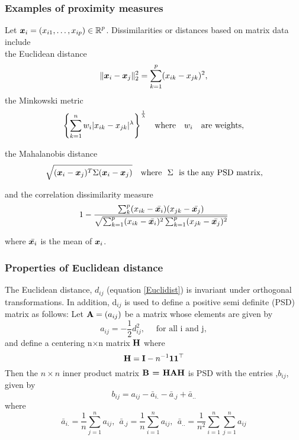 \subsubsection{Examples of proximity measures}
Let $\boldsymbol{x}_{i} = (x_{i1}, \ldots, x_{ip} ) \in \operatorname{\mathbb{R}}^{p}$. Dissimilarities or distances based on matrix data include\\
 the Euclidean distance
\begin{equation}\label{Euclidist}
\displaystyle{ \lVert\boldsymbol{x}_{i} - \boldsymbol{x}_{j}\rVert^{2}_{2} = \sum_{k=1}^{p} (x_{ik} - x_{jk})^{2}  },
\end{equation}
the Minkowski metric 
\begin{equation}\label{Minkowski}
\displaystyle{ \left \{\sum_{k=1}^{n} w_{i} \lvert x_{ik} - x_{jk} \rvert^{\lambda} 
\right \}^{\frac{1}{\lambda}} } \quad \text{where} \quad w_{i} \quad \text{are weights},
\end{equation}

the Mahalanobis distance 
\begin{equation}\label{Mahalanobis}
\displaystyle{ \sqrt{ (\vect{x}_{i} - \vect{x}_{j})^{T} \Sigma (\vect{x}_{i} - \vect{x}_{j})} } \quad \text{where} \ \  \Sigma \ \ \text{is the any PSD matrix},
\end{equation}

and the correlation dissimilarity measure
\begin{equation}\label{correlationdist}
\displaystyle{  1 - \dfrac{ \sum_{k}^{p} (x_{ik} - \bar{\boldsymbol{x}_{i}})
 (x_{jk} - \bar{\boldsymbol{x}_{j}} )} 
 { \sqrt{ \sum_{k=1}^{p}  (x_{ik} - \bar{\boldsymbol{x}_{i}})^{2} 
 \sum_{k=1}^{p} (x_{jk} -   \bar{\boldsymbol{x}_{j}})^{2}    } } } 
\end{equation}

where  $\bar{\boldsymbol{x}_{i}}$ is the mean of $\boldsymbol{x}_{i}$.

\subsubsection{Properties of Euclidean distance}
The Euclidean distance, $d_{ij}$ (equation \eqref{Euclidist}) is invariant under orthogonal transformations. In addition, d$_{ij}$ is used to define a positive semi definite (PSD) matrix as follows: Let $\textbf{A} = (a_{ij})$ be a matrix whose elements are given by 
\begin{equation}\label{afromEuclidist}
a_{ij} = -\frac{1}{2}d_{ij}^{2},\quad \text{ for all i and j},
\end{equation}
 and define a centering n$\times$n matrix $\textbf{H}$ where
\begin{equation}\label{centerMatrix}
\textbf{H} = \textbf{I} - n^{-1}\textbf{1}\textbf{1}^{\top}
\end{equation}
Then the $n\times n$ inner product matrix $\textbf{B = HAH}$ is PSD
with the entries ,$b_{ij}$, given by 
\[ 
b_{ij} = a_{ij} - \bar{a}_{i.} - \bar{a}_{.j} + \bar{a}_{..}
\]
where
\begin{equation}\label{Euclidtransform}
\bar{a}_{i.} = \displaystyle \frac{1}{n}  \sum_{j = 1}^{n} a_{ij}, \ \
\bar{a}_{.j} = \displaystyle \frac{1}{n}    \sum_{i = 1}^{n} a_{ij}, \ \ 
\bar{a}_{..} = \displaystyle \frac{1}{n^2}  \sum_{i=1}^{n} \sum_{j = 1}^{n} a_{ij}  
\end{equation}


